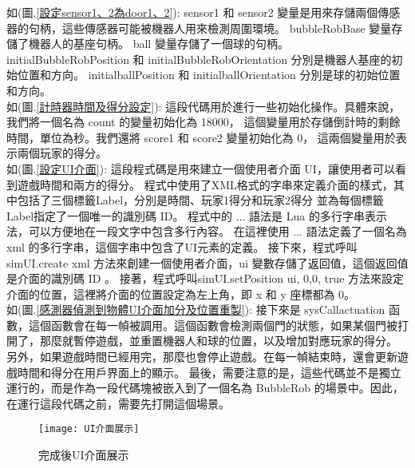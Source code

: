 如(圖.\ref{設定sensor1、2為door1、2}):
sensor1 和 sensor2 變量是用來存儲兩個傳感器的句柄，這些傳感器可能被機器人用來檢測周圍環境。
bubbleRobBase 變量存儲了機器人的基座句柄。
ball 變量存儲了一個球的句柄。
initialBubbleRobPosition 和 initialBubbleRobOrientation 分別是機器人基座的初始位置和方向。
initialballPosition 和 initialballOrientation 分別是球的初始位置和方向。\\

如(圖.\ref{計時器時間及得分設定}):
這段代碼用於進行一些初始化操作。具體來說，我們將一個名為 count 的變量初始化為 18000，
這個變量用於存儲倒計時的剩餘時間，單位為秒。我們還將 score1 和 score2 變量初始化為 0，
這兩個變量用於表示兩個玩家的得分。\\

如(圖.\ref{設定UI介面}):
這段程式碼是用來建立一個使用者介面 UI，讓使用者可以看到遊戲時間和兩方的得分。
程式中使用了XML格式的字串來定義介面的樣式，其中包括了三個標籤Label，分別是時間、玩家1得分和玩家2得分
並為每個標籤Label指定了一個唯一的識別碼 ID。
程式中的 ... 語法是 Lua 的多行字串表示法，可以方便地在一段文字中包含多行內容。
在這裡使用  ...  語法定義了一個名為 xml 的多行字串，這個字串中包含了UI元素的定義。
接下來，程式呼叫 simUI.create xml 方法來創建一個使用者介面，ui 變數存儲了返回值，這個返回值是介面的識別碼 ID 。
接著，程式呼叫simUI.setPosition ui, 0,0, true 方法來設定介面的位置，這裡將介面的位置設定為左上角，即 x 和 y 座標都為 0。\\

如(圖.\ref{感測器偵測到物體UI介面加分及位置重製}):
接下來是 sysCallactuation 函數，這個函數會在每一幀被調用。這個函數會檢測兩個門的狀態，如果某個門被打開了，那麼就暫停遊戲，並重置機器人和球的位置，以及增加對應玩家的得分。
另外，如果遊戲時間已經用完，那麼也會停止遊戲。在每一幀結束時，還會更新遊戲時間和得分在用戶界面上的顯示。
最後，需要注意的是，這些代碼並不是獨立運行的，而是作為一段代碼塊被嵌入到了一個名為 BubbleRob 的場景中。因此，在運行這段代碼之前，需要先打開這個場景。
\begin{figure}[hbt!]
\begin{center}
\texttt{[image: UI介面展示]}
\caption{\Large 完成後UI介面展示}\label{完成後UI介面展示}
\end{center}
\end{figure} 
